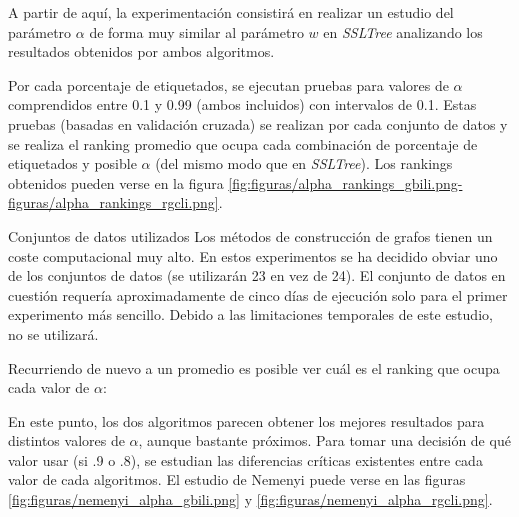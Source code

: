 A partir de aquí, la experimentación consistirá en realizar un estudio del parámetro $\alpha$ de forma muy similar al parámetro $w$ en \textit{SSLTree} analizando los resultados obtenidos por ambos algoritmos.

Por cada porcentaje de etiquetados, se ejecutan pruebas para valores de $\alpha$ comprendidos entre 0.1 y 0.99 (ambos incluidos) con intervalos de 0.1. Estas pruebas (basadas en validación cruzada) se realizan por cada conjunto de datos y se realiza el ranking promedio que ocupa cada combinación de porcentaje de etiquetados y posible $\alpha$ (del mismo modo que en \textit{SSLTree}). Los rankings obtenidos pueden verse en la figura \ref{fig:figuras/alpha_rankings_gbili.png-figuras/alpha_rankings_rgcli.png}.

\begin{mainbox}{Conjuntos de datos utilizados}
    Los métodos de construcción de grafos tienen un coste computacional muy alto. En estos experimentos se ha decidido obviar uno de los conjuntos de datos (se utilizarán 23 en vez de 24). El conjunto de datos en cuestión requería aproximadamente de cinco días de ejecución solo para el primer experimento más sencillo. Debido a las limitaciones temporales de este estudio, no se utilizará.
\end{mainbox}


Recurriendo de nuevo a un promedio es posible ver cuál es el ranking que ocupa cada valor de $\alpha$:


En este punto, los dos algoritmos parecen obtener los mejores resultados para distintos valores de $\alpha$, aunque bastante próximos. Para tomar una decisión de qué valor usar (si .9 o .8), se estudian las diferencias críticas existentes entre cada valor de cada algoritmos. El estudio de Nemenyi puede verse en las figuras \ref{fig:figuras/nemenyi_alpha_gbili.png} y \ref{fig:figuras/nemenyi_alpha_rgcli.png}.



